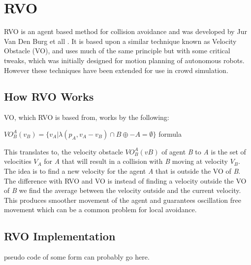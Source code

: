 \documentclass[a4paper,twocolumn]{article}
\begin{document}
\section{RVO}
RVO  is an agent based method for collision avoidance and was developed by Jur Van Den Burg et all \cite{JBerg2008RVO}. It is based upon a similar technique known as Velocity Obstacle (VO), and uses much of the same principle but with some critical tweaks, which was initially designed for motion planning of autonomous robots. However these techniques have been extended for use in crowd  simulation.


\subsection{How RVO Works}
\cite{DCherry2013RVO}
\cite{AGuy2009CP}
\cite{JBerg2008CS}
VO, which RVO is based from, works by the following:\\
\begin{center}

$VO^{A}_{B} (v_{B} ) = \{v_{A} | λ(p_{A} , v_{A} − v_{B} ) ∩ B ⊕ − A = ∅ \}$
formula\\
\end{center}

This translates to, the velocity obstacle $VO^{A}_{B} (v B )$ of agent \emph{B} to \emph{A} is the set of velocities $V_{A}$ for \emph{A} that will result in a collision with \emph{B} moving at velocity $V_{B}$. The idea is to find a new velocity for the agent \emph{A} that is outside the VO of \emph{B}. The difference with RVO and VO is instead of finding a velocity outside the VO of \emph{B} we find the average between the velocity outside and the current velocity. This produces smoother movement of the agent and guarantees oscillation free movement which can be a common problem for local avoidance.

\subsection{RVO Implementation}
pseudo code of some form can probably go here.
\end{document}
